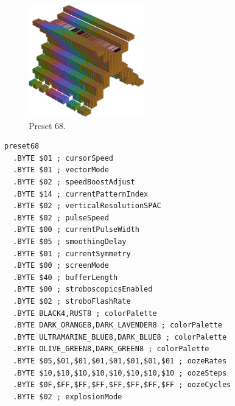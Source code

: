 \vspace*{-0.5cm}
\begin{minipage}[b]{0.48\linewidth}
\begin{figure}[H]                                                          
  \centering                                                             
  \begin{adjustbox}{width=5cm,center}                                   
  \includegraphics[width=5cm]{src/colorspace_presets/preset68-45.png}%
  \end{adjustbox}                                                        
\caption*{Preset 68.}                                           
\end{figure}                                                               
\end{minipage}
\hspace{0.1cm}
\begin{minipage}[b]{0.48\linewidth}                                                                         
\begin{lstlisting}[basicstyle=\ttfamily\tiny]
preset68
  .BYTE $01 ; cursorSpeed
  .BYTE $01 ; vectorMode
  .BYTE $02 ; speedBoostAdjust
  .BYTE $14 ; currentPatternIndex
  .BYTE $02 ; verticalResolutionSPAC
  .BYTE $02 ; pulseSpeed
  .BYTE $00 ; currentPulseWidth
  .BYTE $05 ; smoothingDelay
  .BYTE $01 ; currentSymmetry
  .BYTE $00 ; screenMode
  .BYTE $40 ; bufferLength
  .BYTE $00 ; stroboscopicsEnabled
  .BYTE $02 ; stroboFlashRate
  .BYTE BLACK4,RUST8 ; colorPalette
  .BYTE DARK_ORANGE8,DARK_LAVENDER8 ; colorPalette
  .BYTE ULTRAMARINE_BLUE8,DARK_BLUE8 ; colorPalette
  .BYTE OLIVE_GREEN8,DARK_GREEN8 ; colorPalette
  .BYTE $05,$01,$01,$01,$01,$01,$01,$01 ; oozeRates
  .BYTE $10,$10,$10,$10,$10,$10,$10,$10 ; oozeSteps
  .BYTE $0F,$FF,$FF,$FF,$FF,$FF,$FF,$FF ; oozeCycles
  .BYTE $02 ; explosionMode
\end{lstlisting}
\end{minipage}


